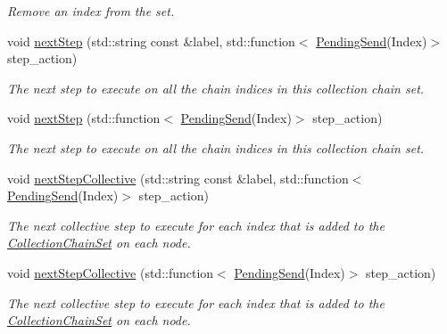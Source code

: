 \begin{DoxyCompactItemize}
\begin{DoxyCompactList}\small\item\em Remove an index from the set. \end{DoxyCompactList}\item 
void \hyperlink{classvt_1_1messaging_1_1_collection_chain_set_aa6ab934f32d8623872cfcd7ed9e147b2}{next\+Step} (std\+::string const \&label, std\+::function$<$ \hyperlink{structvt_1_1messaging_1_1_pending_send}{Pending\+Send}(Index)$>$ step\+\_\+action)
\begin{DoxyCompactList}\small\item\em The next step to execute on all the chain indices in this collection chain set. \end{DoxyCompactList}\item 
void \hyperlink{classvt_1_1messaging_1_1_collection_chain_set_aa4e8a0a24fa7cde6e7f729f4dd002e64}{next\+Step} (std\+::function$<$ \hyperlink{structvt_1_1messaging_1_1_pending_send}{Pending\+Send}(Index)$>$ step\+\_\+action)
\begin{DoxyCompactList}\small\item\em The next step to execute on all the chain indices in this collection chain set. \end{DoxyCompactList}\item 
void \hyperlink{classvt_1_1messaging_1_1_collection_chain_set_a095bc4907c3bd60668483de52b79b08e}{next\+Step\+Collective} (std\+::string const \&label, std\+::function$<$ \hyperlink{structvt_1_1messaging_1_1_pending_send}{Pending\+Send}(Index)$>$ step\+\_\+action)
\begin{DoxyCompactList}\small\item\em The next collective step to execute for each index that is added to the \hyperlink{classvt_1_1messaging_1_1_collection_chain_set}{Collection\+Chain\+Set} on each node. \end{DoxyCompactList}\item 
void \hyperlink{classvt_1_1messaging_1_1_collection_chain_set_a7d226984e696278b9ca7e539c974bab4}{next\+Step\+Collective} (std\+::function$<$ \hyperlink{structvt_1_1messaging_1_1_pending_send}{Pending\+Send}(Index)$>$ step\+\_\+action)
\begin{DoxyCompactList}\small\item\em The next collective step to execute for each index that is added to the \hyperlink{classvt_1_1messaging_1_1_collection_chain_set}{Collection\+Chain\+Set} on each node. \end{DoxyCompactList}\item 

\end{DoxyCompactItemize}
